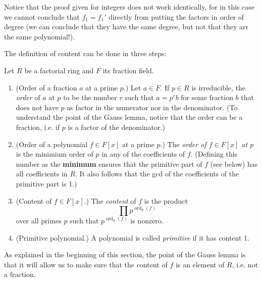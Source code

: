 \begin{remark}
\label{remark-not-the-same-as-%
in-Z}
Notice that the proof given for integers does
not work identically,
for in this case we cannot conclude that
$f_1=f_1'$ directly from putting the
factors in order of degree (we can conclude
that they have the same degree, but
not that they arr the same polynomial!).
\end{remark}

\medskip\noindent
The definition of content can be done in
three steps:

\begin{definition}
\label{definition-content}
\begin{reference}
\cite[p. 181]{Lang-algebra}
\end{reference}
Let $R$ be a factorial ring and
$F$ its fraction field.

\begin{enumerate}
\item (Order of a fraction $a$ at a prime
$p$.)
Let $a \in F$. If $p \in R$ is irreducible,
the {\it order} of $a$ at $p$
to be the number $r$ such that $a=p^rb$ for
some fraction $b$ that does not have
$p$ as factor in the numerator nor in the
denominator. (To understand the point
of the Gauss lemma, notice that the order
can be a fraction, i.e. if $p$ is a factor of
the denominator.)

\item (Order of a polynomial $f \in F[x]$ at
a prime $p$.)
The {\it  order of $f\in F[x]$ at $p$} is the
minimium order of
$p$ in any of the coefficients of $f$.
(Defining this number as the {\bf
minimum} ensures that the primitive part of
$f$ (see below) has all coefficients
in $R$. It also follows that the gcd of the
coefficients of the primitive part is 1.)

\item (Content of $f \in F[x]$.) The {\it
content} of $f$ is the product
$$
\prod p^{\operatorname{ord}_p(f)}
$$
over all primes $p$ such that
$p^{\operatorname{ord}_p(f)}$ is nonzero.

\item (Primitive polynomial.) A polynomial is
called {\it primitive} if it has content 1.
\end{enumerate}
\end{definition}

As explained in the beginning of this
section, the point of the Gauss
lemma is that it will allow us to make sure
that the content of $f$ is an
element of $R$, i.e. not a fraction.

